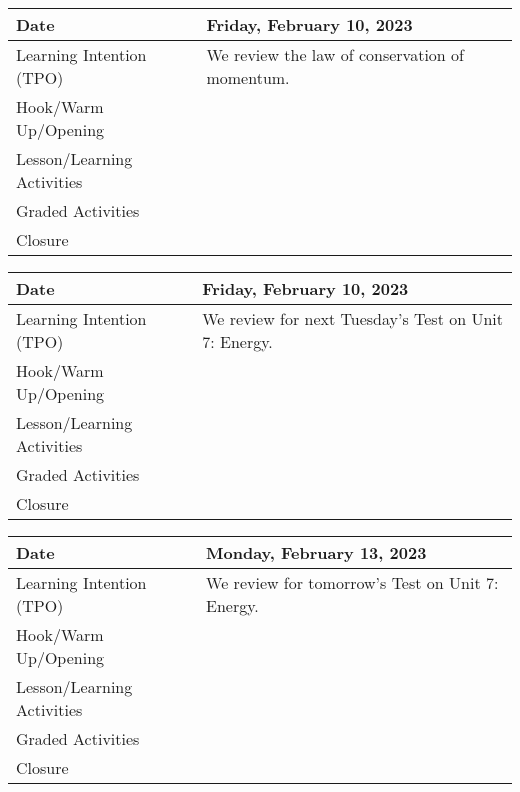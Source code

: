 \documentclass[main.tex]{subfiles}
\begin{document}
\begin{tabular}{|m{}|m{}|}
    \hline  
    \cellcolor{black!20}\textbf{Date} &
    \cellcolor{black!20}\textbf{Friday, February 10, 2023} \\
    \hline
    Learning Intention (TPO) & We review the law of conservation of momentum.\\
    \hline
    Hook/Warm Up/Opening & \\
    \hline
    Lesson/Learning Activities & \\
    \hline
    Graded Activities & \\
    \hline
    Closure & \\  
    \hline
\end{tabular} 

\begin{tabular}{|m{}|m{}|}
    \hline  
    \cellcolor{black!20}\textbf{Date} &
    \cellcolor{black!20}\textbf{Friday, February 10, 2023} \\
    \hline
    Learning Intention (TPO) &  We review for next Tuesday's Test on Unit 7: Energy.\\
    \hline
    Hook/Warm Up/Opening & \\
    \hline
    Lesson/Learning Activities & \\
    \hline
    Graded Activities & \\
    \hline
    Closure & \\  
    \hline
\end{tabular} 

\begin{tabular}{|m{}|m{}|}
    \hline  
    \cellcolor{black!20}\textbf{Date} &
    \cellcolor{black!20}\textbf{Monday, February 13, 2023} \\
    \hline
    Learning Intention (TPO) & We review for tomorrow's Test on Unit 7: Energy.\\
    \hline
    Hook/Warm Up/Opening & \\
    \hline
    Lesson/Learning Activities & \\
    \hline
    Graded Activities & \\
    \hline
    Closure & \\  
    \hline
\end{tabular} 
\end{document}
